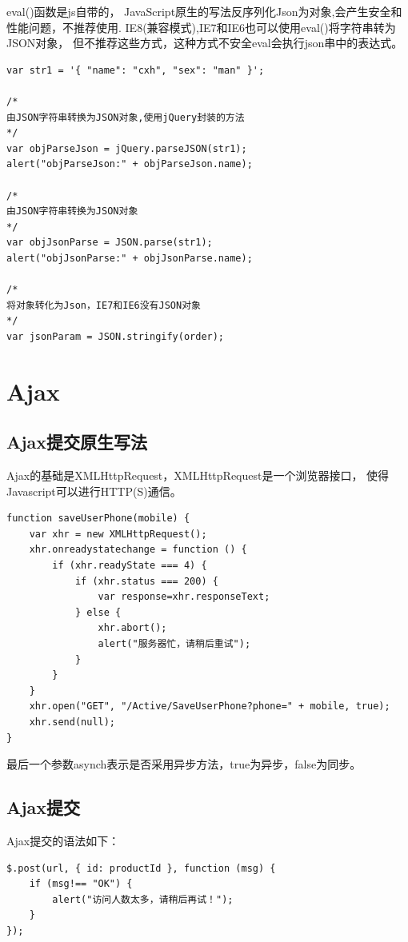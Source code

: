 \documentclass{book}
\begin{document}
eval()函数是js自带的，
JavaScript原生的写法反序列化Json为对象,会产生安全和性能问题，不推荐使用.
IE8(兼容模式),IE7和IE6也可以使用eval()将字符串转为JSON对象，
但不推荐这些方式，这种方式不安全eval会执行json串中的表达式。 

\begin{lstlisting}[language=VBScript]
var str1 = '{ "name": "cxh", "sex": "man" }';

/*
由JSON字符串转换为JSON对象,使用jQuery封装的方法
*/
var objParseJson = jQuery.parseJSON(str1);
alert("objParseJson:" + objParseJson.name);

/*
由JSON字符串转换为JSON对象
*/
var objJsonParse = JSON.parse(str1);
alert("objJsonParse:" + objJsonParse.name);

/*
将对象转化为Json，IE7和IE6没有JSON对象
*/
var jsonParam = JSON.stringify(order);
\end{lstlisting}

\section{Ajax}

\subsection{Ajax提交原生写法}

Ajax的基础是XMLHttpRequest，XMLHttpRequest是一个浏览器接口，
使得Javascript可以进行HTTP(S)通信。

\begin{lstlisting}[language=VBScript]
function saveUserPhone(mobile) {
    var xhr = new XMLHttpRequest();
    xhr.onreadystatechange = function () {
        if (xhr.readyState === 4) {
            if (xhr.status === 200) {
            	var response=xhr.responseText;                
            } else {
            	xhr.abort();
                alert("服务器忙，请稍后重试");                
            }
        }
    }
    xhr.open("GET", "/Active/SaveUserPhone?phone=" + mobile, true);
    xhr.send(null);
}
\end{lstlisting}

最后一个参数asynch表示是否采用异步方法，true为异步，false为同步。

\subsection{Ajax提交}

Ajax提交的语法如下：

\begin{lstlisting}[language=VBScript]
$.post(url, { id: productId }, function (msg) {
    if (msg!== "OK") {
        alert("访问人数太多，请稍后再试！");
    }
});
\end{lstlisting}
\end{document}
